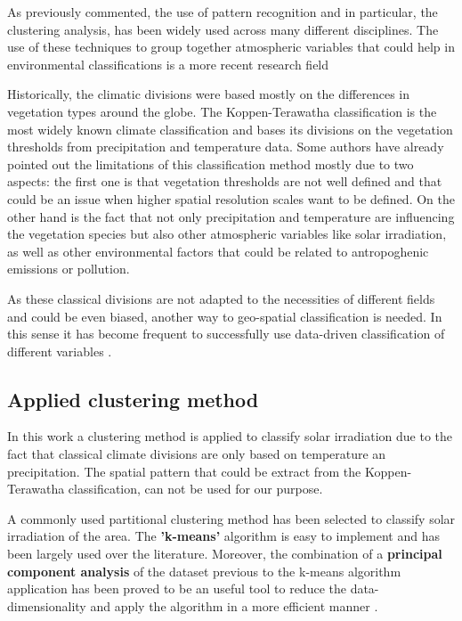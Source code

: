 As previously commented, the use of pattern recognition and in particular, the clustering analysis, has been widely used across many different disciplines. The use of these techniques to group together atmospheric variables that could help in environmental classifications is a more recent research field \cite*{ZSCHEISCHLER2012897}

Historically, the climatic divisions were based mostly on the differences in vegetation types around the globe. The Koppen-Terawatha classification \cite*{Kottek2006} is the most widely known climate classification and bases its divisions on the vegetation thresholds from precipitation and temperature data. Some authors have already pointed out the limitations of this classification method mostly due to two aspects: the first one is that vegetation thresholds are not well defined and that could be an issue when higher spatial resolution scales want to be defined. On the other hand is the fact that not only precipitation and temperature are influencing the vegetation species but also other atmospheric variables like solar irradiation, as well as other environmental factors that could be related to antropoghenic emissions or pollution.


As these classical divisions are not adapted to the necessities of different fields and could be even biased, another way to geo-spatial classification is needed. In this sense it has become frequent to successfully use data-driven classification of different variables \cite{Argueso2011, Zagouras2013, Zagouras2014, Zagouras2014b, ZSCHEISCHLER2012897}. 

\subsection{Applied clustering method}

In this work a clustering method is applied to classify solar irradiation due to the fact that classical climate divisions are only based on temperature an precipitation. The spatial pattern that could be extract from the Koppen-Terawatha classification, can not be used for our purpose.

A commonly used partitional clustering method has been selected to classify solar irradiation of the area. The \textbf{'k-means'} algorithm is easy to implement and has been largely used over the literature. Moreover, the combination of a \textbf{principal component analysis} of the dataset previous to the k-means algorithm application has been proved to be an useful tool to reduce the data-dimensionality and apply the algorithm in a more efficient manner \cite*{Ding2004}.


